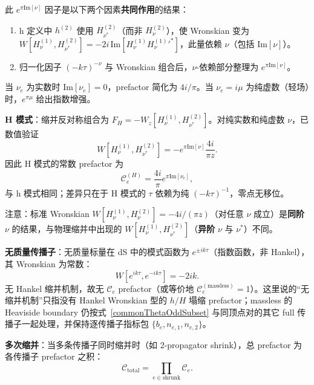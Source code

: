﻿\documentclass[a4paper,11pt]{article}
\begin{document}
此 $e^{\pi\text{Im}[\nu]}$ 因子是以下两个因素\textbf{共同作用}的结果：
\begin{enumerate}
  \item h 定义中 $h^{(2)}$ 使用 $H_{\nu^*}^{(2)}$（而非 $H_\nu^{(2)}$），使 Wronskian 变为 $W[H_\nu^{(1)}, H_{\nu^*}^{(2)}] = -2i\,\text{Im}[H_\nu^{(1)} {H_\nu^{(1)}}'^*]$，此量依赖 $\nu$（包括 $\text{Im}[\nu]$）。
  \item 归一化因子 $(-k\tau)^{-\nu}$ 与 Wronskian 组合后，$\nu$-依赖部分整理为 $e^{\pi\text{Im}[\nu]}$。
\end{enumerate}

当 $\nu_e$ 为实数时 $\text{Im}[\nu_e] = 0$，prefactor 简化为 $4i/\pi$。当 $\nu_e = i\mu$ 为纯虚数（轻场）时，$e^{\pi\mu}$ 给出指数增强。

\textbf{H 模式}：缩并反对称组合为 $F_H=-W_z[H_\nu^{(1)},H_{\nu^*}^{(2)}]$。对纯实数和纯虚数 $\nu$，已数值验证
\begin{equation}
  W[H_\nu^{(1)}, H_{\nu^*}^{(2)}] = -e^{\pi\text{Im}[\nu]} \frac{4i}{\pi z}.
  \label{WcrossOrder}
\end{equation}
因此 H 模式的常数 prefactor 为
\begin{equation}
  \mathcal{C}_e^{(H)} = \frac{4i}{\pi} e^{\pi\text{Im}[\nu_e]},
\end{equation}
与 h 模式相同；差异只在于 H 模式的 $\tau$ 依赖为纯 $(-k\tau)^{-1}$，零点无移位。

注意：标准 Wronskian $W[H_\nu^{(1)}, H_\nu^{(2)}] = -4i/(\pi z)$（对任意 $\nu$ 成立）是\textbf{同阶} $\nu$ 的结果，与物理缩并中出现的 $W[H_\nu^{(1)}, H_{\nu^*}^{(2)}]$（\textbf{异阶} $\nu$ 与 $\nu^*$）不同。

\textbf{无质量传播子}：无质量标量在 dS 中的模式函数为 $e^{\pm ik\tau}$（指数函数，非 Hankel），其 Wronskian 为常数：
\begin{equation}
  W[e^{ik\tau}, e^{-ik\tau}] = -2ik.
\end{equation}
无 Hankel 缩并机制，故无 $\mathcal{C}_e$ prefactor（或等价地 $\mathcal{C}_e^{(\text{massless})} = 1$）。这里说的“无缩并机制”只指没有 Hankel Wronskian 型的 $h/H$ 塌缩 prefactor；massless 的 Heaviside boundary 仍按式~\eqref{commonThetaOddSubset} 与同顶点对的其它 full 传播子一起处理，并保持逐传播子指标包 $\{b_e,n_{e,1},n_{e,2}\}$。

\textbf{多次缩并}：当多条传播子同时缩并时（如 2-propagator shrink），总 prefactor 为各传播子 prefactor 之积：
\begin{equation}
  \mathcal{C}_{\text{total}} = \prod_{e \in \text{shrunk}} \mathcal{C}_e.
  \label{prefactorTotal}
\end{equation}
\end{document}
